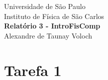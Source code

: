 \documentclass[12pt,a4paper]{article}
\begin{document}
	\begin{titlepage}
		\begin{center}
			\large Universidade de São Paulo\\[0.2cm]
			\large Instituto de Física de São Carlos\\[7cm]
			\huge \textbf{Relatório 3 - IntroFisComp}\\[6cm]
			
			\large Alexandre de Taunay Voloch \\[0.2cm]
		\end{center}
	\end{titlepage}

\section{Tarefa 1}
\end{document}
